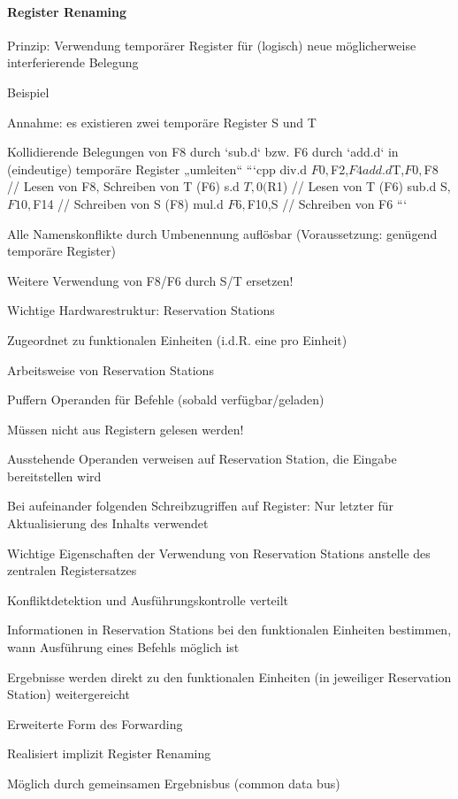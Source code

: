 \documentclass[10pt,landscape]{article}
\begin{document}
\begin{multicols}{3}
  \paragraph{ Register Renaming}
  \begin{itemize*}
    \item Prinzip: Verwendung temporärer Register für (logisch) neue möglicherweise interferierende Belegung
    \item Beispiel
    \item Annahme: es existieren zwei temporäre Register S und T
    \item Kollidierende Belegungen von F8 durch `sub.d` bzw. F6 durch `add.d` in (eindeutige) temporäre Register „umleiten“
    ```cpp
    div.d $F0,$F2,$F4
      add.d $T,$F0,$F8   // Lesen von F8, Schreiben von T (F6)
    s.d   $T,0($R1)    // Lesen von T (F6)
    sub.d S,$F10,$F14  // Schreiben von S (F8)
    mul.d $F6,$F10,S   // Schreiben von F6
    ```
    \item Alle Namenskonflikte durch Umbenennung auflösbar (Voraussetzung: genügend temporäre Register)
    \item Weitere Verwendung von F8/F6 durch S/T ersetzen!
    \item Wichtige Hardwarestruktur: Reservation Stations
    \item Zugeordnet zu funktionalen Einheiten (i.d.R. eine pro Einheit)
    \item Arbeitsweise von Reservation Stations
    \item Puffern Operanden für Befehle (sobald verfügbar/geladen)
    \item Müssen nicht aus Registern gelesen werden!
    \item Ausstehende Operanden verweisen auf Reservation Station, die Eingabe bereitstellen wird
    \item Bei aufeinander folgenden Schreibzugriffen auf Register: Nur letzter für Aktualisierung des Inhalts verwendet
    \item Wichtige Eigenschaften der Verwendung von Reservation Stations anstelle des zentralen Registersatzes
    \item Konfliktdetektion und Ausführungskontrolle verteilt
    \item Informationen in Reservation Stations bei den funktionalen Einheiten bestimmen, wann Ausführung eines Befehls möglich ist
    \item Ergebnisse werden direkt zu den funktionalen Einheiten (in jeweiliger Reservation Station) weitergereicht
    \item Erweiterte Form des Forwarding
    \item Realisiert implizit Register Renaming
    \item Möglich durch gemeinsamen Ergebnisbus (common data bus)
  \end{itemize*}
  

\end{multicols}
\end{document}
